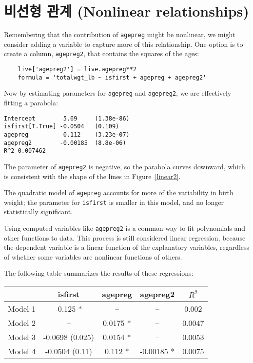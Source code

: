 

\section{비선형 관계 (Nonlinear relationships)}
\label{nonlinear}

Remembering that the contribution of {\tt agepreg} might be nonlinear,
we might consider adding a variable to capture more of this
relationship.  One option is to create a column, {\tt agepreg2},
that contains the squares of the ages:

\begin{verbatim}
    live['agepreg2'] = live.agepreg**2
    formula = 'totalwgt_lb ~ isfirst + agepreg + agepreg2'
\end{verbatim}

Now by estimating parameters for {\tt agepreg} and {\tt agepreg2},
we are effectively fitting a parabola:

\begin{verbatim}
Intercept        5.69     (1.38e-86)
isfirst[T.True] -0.0504   (0.109)
agepreg          0.112    (3.23e-07)
agepreg2        -0.00185  (8.8e-06)
R^2 0.007462
\end{verbatim}

The parameter of {\tt agepreg2} is negative, so the parabola
curves downward, which is consistent with the shape of the lines
in Figure~\ref{linear2}.

The quadratic model of {\tt agepreg} accounts for more of the
variability in birth weight; the parameter for {\tt isfirst}
is smaller in this model, and no longer statistically significant.
   

Using computed variables like {\tt agepreg2} is a common way to
fit polynomials and other functions to data.  
This process is still considered linear
regression, because the dependent variable is a linear function of
the explanatory variables, regardless of whether some variables
are nonlinear functions of others.

The following table summarizes the results of these regressions:

\begin{center}
\begin{tabular}{|l|c|c|c|c|}
\hline & isfirst & agepreg & agepreg2 & $R^2$ \\ \hline
Model 1 & -0.125 * & -- & -- & 0.002 \\
Model 2 & -- & 0.0175 * & -- & 0.0047 \\
Model 3 & -0.0698 (0.025) & 0.0154 * & -- & 0.0053 \\
Model 4 & -0.0504 (0.11) & 0.112 * & -0.00185 * & 0.0075 \\
\hline
\end{tabular}
\end{center}

